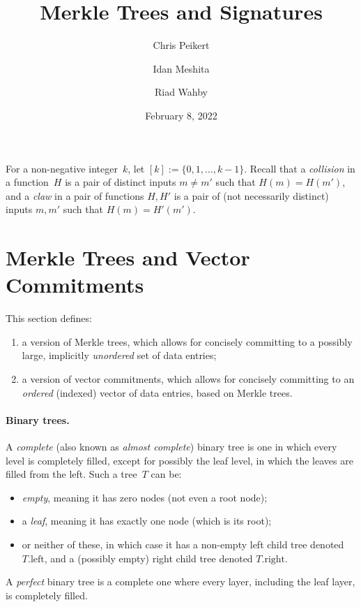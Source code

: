 \documentclass[11pt,hidelinks]{article}
\title{Merkle Trees and Signatures}
\date{February 8, 2022}
\author{Chris Peikert}
\author{Idan Meshita}
\author{Riad Wahby}
\affil{Algorand, Inc.}
\begin{document}
\maketitle

\listoffixmes


For a non-negative integer~$k$, let $[k] := \{0, 1, \ldots,
k-1\}$. Recall that a \emph{collision} in a function~$H$ is a pair of
distinct inputs $m \neq m'$ such that $H(m) = H(m')$, and a
\emph{claw} in a pair of functions $H,H'$ is a pair of (not
necessarily distinct) inputs $m,m'$ such that $H(m) = H'(m')$.

\section{Merkle Trees and Vector Commitments}
\label{sec:merkle-vc}

This section defines:
\begin{enumerate}[itemsep=0pt]
\item a version of Merkle trees, which allows for concisely committing
  to a possibly large, implicitly \emph{unordered} set of data
  entries;
\item a version of vector commitments, which allows for concisely
  committing to an \emph{ordered} (indexed) vector of data entries,
  based on Merkle trees.
\end{enumerate}

\paragraph{Binary trees.}

A \emph{complete} (also known as \emph{almost complete}) binary tree
is one in which every level is completely filled, except for possibly
the leaf level, in which the leaves are filled from the left. Such a
tree~$T$ can be:
\begin{itemize}[itemsep=0pt]
\item \emph{empty}, meaning it has zero nodes (not even a root node);
\item a \emph{leaf}, meaning it has exactly one node (which is its
  root);
\item or neither of these, in which case it has a non-empty left child
  tree denoted $T.\text{left}$, and a (possibly empty) right child
  tree denoted $T.\text{right}$.
\end{itemize}
A \emph{perfect} binary tree is a complete one where every layer,
including the leaf layer, is completely filled.
\end{document}
